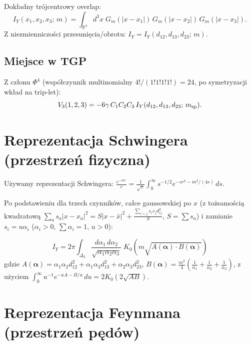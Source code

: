 \documentclass[11pt,a4paper]{article}
\begin{document}
Dok\l{}adny tr\'ojcentrowy overlap:
\begin{equation}
\label{eq:IY_def}
I_Y(x_1,x_2,x_3;\,m)
= \int_{\mathbb{R}^3} d^3x\;
G_m(|x-x_1|)\,G_m(|x-x_2|)\,G_m(|x-x_3|).
\end{equation}
Z niezmienniczo\'sci przesuni\k{e}cia/obrotu: $I_Y = I_Y(d_{12},d_{13},d_{23};\,m)$.

\subsection{Miejsce w TGP}

Z cz\l{}onu $\Phi^4$ (wsp\'o\l{}czynnik multinomialny $4!/(1!1!1!1!)=24$,
po symetryzacji wk\l{}ad na trip-let):
\begin{equation}
\label{eq:V3_def}
V_3(1,2,3) = -6\gamma\,C_1 C_2 C_3\,I_Y(d_{12},d_{13},d_{23};\,m_{\rm sp}).
\end{equation}

\section{Reprezentacja Schwingera (przestrze\'n fizyczna)}
\label{sec:schwinger}

U\.{z}ywamy reprezentacji Schwingera:
$\frac{e^{-mr}}{r} = \frac{1}{\sqrt{\pi}}\int_0^\infty s^{-1/2}
e^{-sr^2-m^2/(4s)}\,ds$.

Po podstawieniu dla trzech czynnik\'ow, ca\l{}ce gaussowskiej po $x$
(z to\.{z}samo\'sci\k{a} kwadratow\k{a} $\sum_a s_a|x-x_a|^2
= S|x-\bar x|^2 + \frac{\sum_{i<j}s_is_j d_{ij}^2}{S}$, $S=\sum s_a$)
i zamianie $s_i = u\alpha_i$ ($\alpha_i>0$, $\sum\alpha_i=1$, $u>0$):

\begin{equation}
\label{eq:IY_schwinger_2D}
\boxed{
I_Y = 2\pi \int_{\Delta_2}
\frac{d\alpha_1\,d\alpha_2}{\sqrt{\alpha_1\alpha_2\alpha_3}}\;
K_0\!\left(
m\sqrt{A(\bm\alpha)\cdot B(\bm\alpha)}
\right)
}
\end{equation}
gdzie $A(\bm\alpha) = \alpha_1\alpha_2 d_{12}^2+\alpha_1\alpha_3 d_{13}^2+\alpha_2\alpha_3 d_{23}^2$,
$B(\bm\alpha) = \frac{m^2}{4}\!\left(\frac{1}{\alpha_1}+\frac{1}{\alpha_2}+\frac{1}{\alpha_3}\right)$,
z u\.{z}yciem $\int_0^\infty u^{-1}e^{-uA-B/u}\,du = 2K_0(2\sqrt{AB})$.

\section{Reprezentacja Feynmana (przestrze\'n p\k{e}d\'ow)}
\label{sec:feynman}
\end{document}
